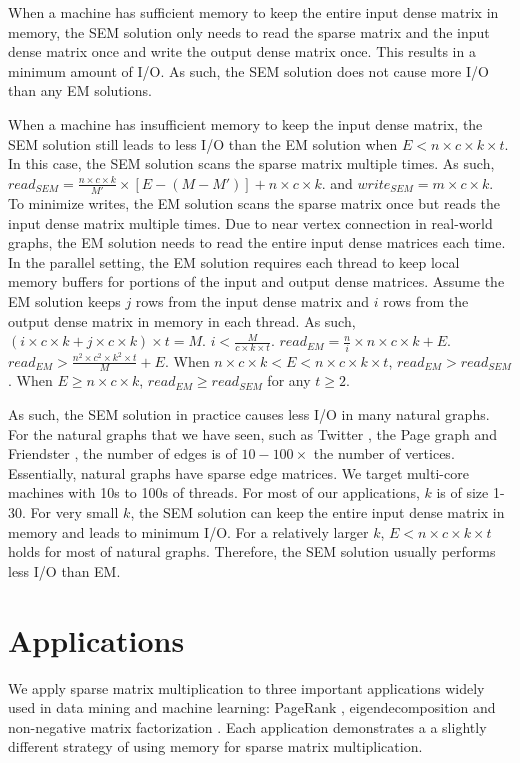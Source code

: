 When a machine has sufficient memory to keep the entire input dense matrix
in memory, the SEM solution only needs to read the sparse matrix and the input
dense matrix once and write the output dense matrix once. This results in
a minimum amount of I/O. As such, the SEM solution does not cause more I/O
than any EM solutions.

When a machine has insufficient memory to keep the input dense matrix, the SEM
solution still leads to less I/O than the EM solution when
$E < n \times c \times k \times t$.
In this case, the SEM solution scans the sparse matrix multiple times. As such,
$read_{SEM} = \frac{n \times c \times k}{M'} \times [E - (M - M')] + n \times c \times k$.
and $write_{SEM} = m \times c \times k$. To minimize writes, the EM solution
scans the sparse matrix once but reads the input dense matrix multiple times.
Due to near vertex connection in real-world graphs, the EM solution needs to
read the entire input dense matrices each time. In the parallel setting,
the EM solution requires each thread to keep local memory buffers for portions
of the input and output dense matrices. Assume the EM solution keeps $j$ rows
from the input dense matrix and $i$ rows from the output dense matrix in memory
in each thread. As such,
$(i \times c \times k + j \times c \times k) \times t = M$.
$i < \frac{M}{c \times k \times t}$.
$read_{EM} = \frac{n}{i} \times n \times c \times k + E$.
$read_{EM} > \frac{n^2 \times c^2 \times k^2 \times t}{M} + E$.
When $n \times c \times k < E < n \times c \times k \times t$, $read_{EM} > read_{SEM}$.
When $E \geq n \times c \times k$, $read_{EM} \geq read_{SEM}$ for any $t \geq 2$.

As such, the SEM solution in practice causes less I/O in many natural graphs.
For the natural graphs that we have seen, such as Twitter \cite{twitter},
the Page graph \cite{web_graph} and Friendster \cite{friendster}, the number
of edges is of $10-100 \times$ the number of vertices. Essentially,
natural graphs have sparse edge matrices. We target multi-core machines with
10s to 100s of threads. For most of our applications, $k$ is of size 1-30.
For very small $k$, the SEM
solution can keep the entire input dense matrix in memory and leads to minimum
I/O. For a relatively larger $k$, $E < n \times c \times k \times t$ holds
for most of natural graphs. Therefore, the SEM solution usually performs less
I/O than EM.

\section{Applications} \label{sec:apps}
We apply sparse matrix multiplication to three important applications widely
used in data mining and machine learning: PageRank \cite{pagerank},
eigendecomposition \cite{anasazi} and non-negative matrix factorization \cite{nmf}.
Each application demonstrates a a slightly different strategy of using memory
for sparse matrix multiplication.

